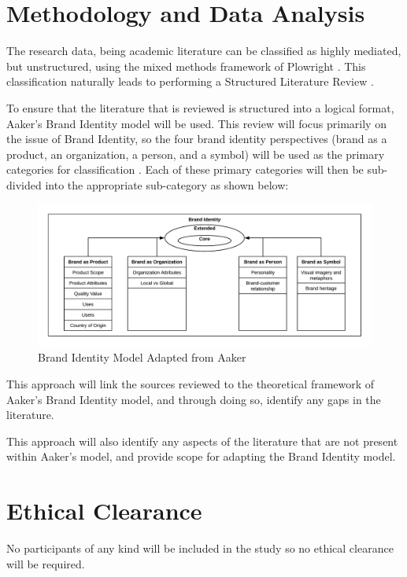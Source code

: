 \documentclass[10pt,twoside]{article}
\begin{document}
\section{Methodology and Data Analysis}

The research data, being academic literature can be classified as highly mediated, but unstructured, using the mixed methods framework of Plowright \cite{plowright2011using}. This classification naturally leads to performing a Structured Literature Review \cite{petticrew2008systematic}.

To ensure that the literature that is reviewed is structured into a logical format, Aaker's Brand Identity model will be used. This review will focus primarily on the issue of Brand Identity, so the four brand identity perspectives (brand as a product, an organization, a person, and a symbol) will be used as the primary categories for classification \cite{aaker2012brand}. Each of these primary categories will then be sub-divided into the appropriate sub-category as shown below:

\begin{figure}[h]
\caption{Brand Identity Model Adapted from Aaker}
\centering
\includegraphics[width=1.2\textwidth]{BrandIdentityModel.png}
\end{figure}

This approach will link the sources reviewed to the theoretical framework of Aaker's Brand Identity model, and through doing so, identify any gaps in the literature.

This approach will also identify any aspects of the literature that are not present within Aaker's model, and provide scope for adapting the Brand Identity model.

\section{Ethical Clearance}
No participants of any kind will be included in the study so no ethical clearance will be required.
\end{document}
